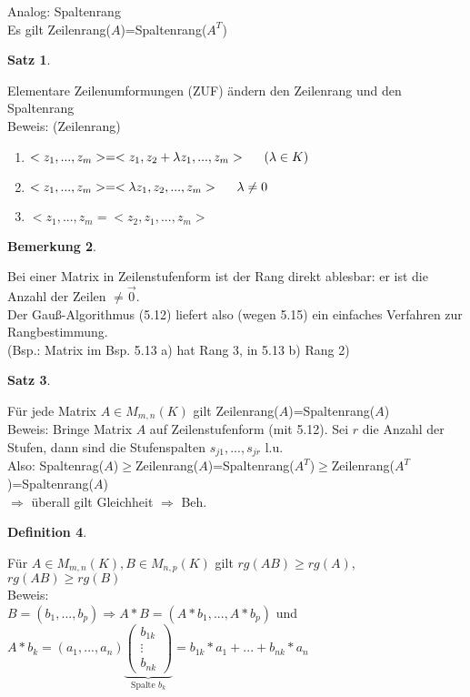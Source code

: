 \documentclass[a4paper,11pt]{article}
\newtheorem{definition}{Definition}[section]
\newtheorem{satz}[definition]{Satz}
\newtheorem{bem}[definition]{Bemerkung}
\begin{document}
Analog: Spaltenrang \\
Es gilt Zeilenrang($A$)=Spaltenrang($A^T$)
\begin{satz}
\end{satz}
Elementare Zeilenumformungen (ZUF) ändern den Zeilenrang und den Spaltenrang \\
Beweis: (Zeilenrang)
\begin{enumerate}[label=(\arabic*)]
\item $<z_1,...,z_m>=<z_1,z_2+\lambda z_1,...,z_m>\hspace{5mm}(\lambda\in K)$
\item $<z_1,...,z_m>=<\lambda z_1,z_2,...,z_m>\hspace{5mm}\lambda\neq 0$
\item $<z_1,...,z_m=<z_2,z_1,...,z_m>$
\end{enumerate}
\newpage
\begin{bem}
\end{bem}
Bei einer Matrix in Zeilenstufenform ist der Rang direkt ablesbar: er ist die Anzahl der Zeilen $\neq\overset{\rightarrow}{0}$. \\
Der Gauß-Algorithmus (5.12) liefert also (wegen 5.15) ein einfaches Verfahren zur Rangbestimmung. \\
(Bsp.: Matrix im Bsp. 5.13 a) hat Rang 3, in 5.13 b) Rang 2)
\begin{satz}
\end{satz}
Für jede Matrix $A\in M_{m,n}(K)$ gilt Zeilenrang($A$)=Spaltenrang($A$) \\
Beweis: Bringe Matrix $A$ auf Zeilenstufenform (mit 5.12). Sei $r$ die Anzahl der Stufen, dann sind die Stufenspalten $s_{j1},...,s_{jr}$ l.u. \\
Also: Spaltenrag($A$)$\geq$Zeilenrang($A$)=Spaltenrang($A^T$)$\geq$Zeilenrang($A^T$)=Spaltenrang($A$) \\
$\Rightarrow$ überall gilt Gleichheit $\Rightarrow$ Beh.
\begin{definition}
\end{definition}
Für $A\in M_{m,n}(K),B\in M_{n,p}(K)$ gilt $rg(AB)\geq rg(A)$, $rg(AB)\geq rg(B)$ \\
Beweis: \\
$B=(b_1,...,b_p)\Rightarrow A*B=(A*b_1,...,A*b_p)$ und $A*b_k=(a_1,...,a_n)\underbrace{\begin{pmatrix}b_{1k}\\\vdots\\b_{nk}\end{pmatrix}}_{\text{Spalte }b_k}=b_{1k}*a_1+...+b_{nk}*a_n$ \\
\end{document}
